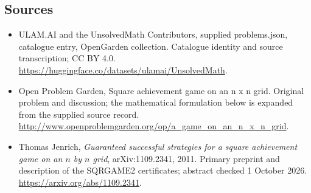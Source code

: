 \documentclass[11pt,a4paper]{article}
\begin{document}
\subsection{Sources}
\begin{itemize}
\item[S1] ULAM.AI and the UnsolvedMath Contributors, supplied problems.json, catalogue entry, OpenGarden collection. Catalogue identity and source transcription; CC BY 4.0.
\url{https://huggingface.co/datasets/ulamai/UnsolvedMath}.
\item[S2] Open Problem Garden, Square achievement game on an n x n grid. Original problem and discussion; the mathematical formulation below is expanded from the supplied source record.
\url{http://www.openproblemgarden.org/op/a_game_on_an_n_x_n_grid}.

\item[R1] Thomas Jenrich, \emph{Guaranteed successful strategies for
a square achievement game on an $n$ by $n$ grid}, arXiv:1109.2341,
2011. Primary preprint and description of the SQRGAME2 certificates;
abstract checked 1 October 2026.
\url{https://arxiv.org/abs/1109.2341}.

\end{itemize}
\end{document}
